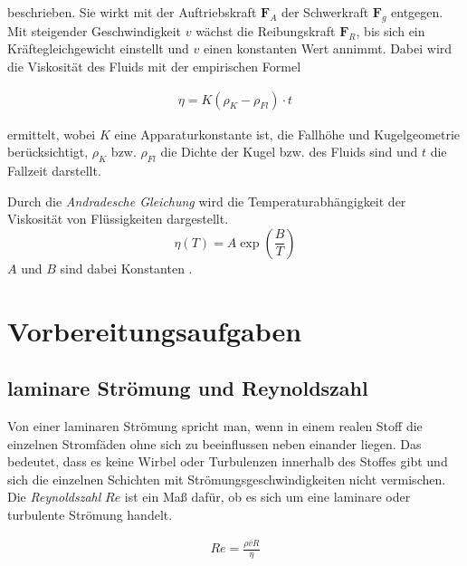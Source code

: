 beschrieben.
Sie wirkt mit der Auftriebskraft $\symbf{F}_A$ der Schwerkraft $\symbf{F}_g$ entgegen. 
Mit steigender Geschwindigkeit $v$ wächst die Reibungskraft $\symbf{F}_R$, bis sich ein Kräftegleichgewicht einstellt
und $v$ einen konstanten Wert annimmt.
Dabei wird die Viskosität des Fluids mit der empirischen Formel 

\begin{align}
    \label{eq:empirisch}
    \eta = K \left(\rho_K -\rho_{Fl}\right) \cdot t
\end{align}

ermittelt, wobei $K$ eine Apparaturkonstante ist, die Fallhöhe und Kugelgeometrie berücksichtigt,
$\rho_K$ bzw. $\rho_{Fl}$ die Dichte der Kugel bzw. des Fluids sind und $t$ die Fallzeit darstellt.


Durch die \textit{Andradesche Gleichung} wird die Temperaturabhängigkeit der Viskosität von Flüssigkeiten dargestellt.
\begin{equation}
\label{eq:andrade}
    \eta \left(T\right) = A \exp{\left(\frac{B}{T}\right)}
\end{equation}
$A$ und $B$ sind dabei Konstanten \cite*[]{va207}.






\section{Vorbereitungsaufgaben}
\subsection{laminare Strömung und Reynoldszahl}
\label{sec:vorbereitung}
Von einer laminaren Strömung spricht man, wenn in einem realen Stoff
die einzelnen Stromfäden ohne sich zu beeinflussen neben einander liegen. Das bedeutet, dass es keine Wirbel oder
Turbulenzen innerhalb des Stoffes gibt und sich die einzelnen Schichten mit Strömungsgeschwindigkeiten nicht vermischen.
Die \textit{Reynoldszahl} $Re$ ist ein Maß dafür, ob es sich um eine laminare oder turbulente Strömung handelt.

\begin{align}
    Re = \frac{\rho \overline{v} R}{\eta}
\end{align}

